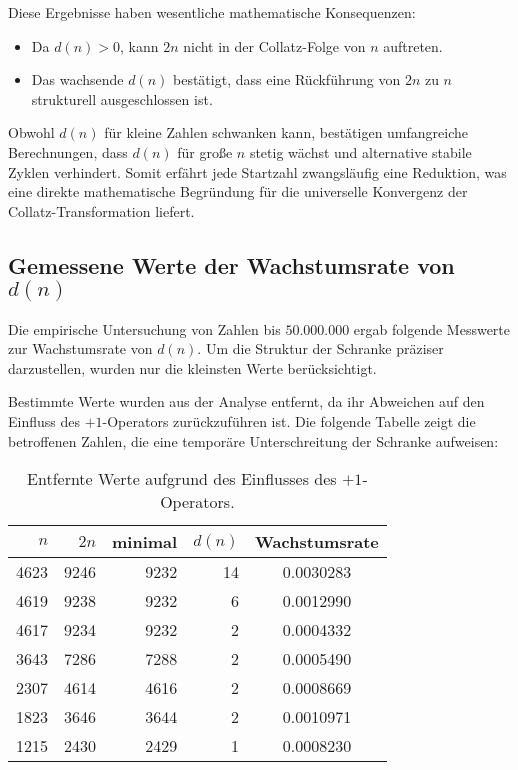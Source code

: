\documentclass[a4paper,12pt]{article}
\begin{document}
Diese Ergebnisse haben wesentliche mathematische Konsequenzen:
\begin{itemize}
    \item Da \( d(n) > 0 \), kann \( 2n \) nicht in der Collatz-Folge von \( n \) auftreten.
    \item Das wachsende \( d(n) \) bestätigt, dass eine Rückführung von \( 2n \) zu \( n \) strukturell ausgeschlossen ist.
\end{itemize}

Obwohl \( d(n) \) für kleine Zahlen schwanken kann, bestätigen umfangreiche Berechnungen, dass \( d(n) \) für große \( n \) stetig wächst und alternative stabile Zyklen verhindert. Somit erfährt jede Startzahl zwangsläufig eine Reduktion, was eine direkte mathematische Begründung für die universelle Konvergenz der Collatz-Transformation liefert.



\subsection{Gemessene Werte der Wachstumsrate von \( d(n) \)}

Die empirische Untersuchung von Zahlen bis \( 50.000.000 \) ergab folgende Messwerte zur Wachstumsrate von \( d(n) \). Um die Struktur der Schranke präziser darzustellen, wurden nur die kleinsten Werte berücksichtigt.

Bestimmte Werte wurden aus der Analyse entfernt, da ihr Abweichen auf den Einfluss des \(+1\)-Operators zurückzuführen ist. Die folgende Tabelle zeigt die betroffenen Zahlen, die eine temporäre Unterschreitung der Schranke aufweisen:

\begin{table}[h]
    \centering
    \begin{tabular}{|r|r|r|r|c|}
        \hline
        \( n \) & \( 2n \) & minimal & \( d(n) \) & Wachstumsrate \\
        \hline
        4623  & 9246  & 9232  & 14  & 0.0030283 \\
        4619  & 9238  & 9232  & 6   & 0.0012990 \\
        4617  & 9234  & 9232  & 2   & 0.0004332 \\
        3643  & 7286  & 7288  & 2   & 0.0005490 \\
        2307  & 4614  & 4616  & 2   & 0.0008669 \\
        1823  & 3646  & 3644  & 2   & 0.0010971 \\
        1215  & 2430  & 2429  & 1   & 0.0008230 \\
        \hline
    \end{tabular}
    \caption{Entfernte Werte aufgrund des Einflusses des \( +1 \)-Operators.}
\end{table}
\end{document}
